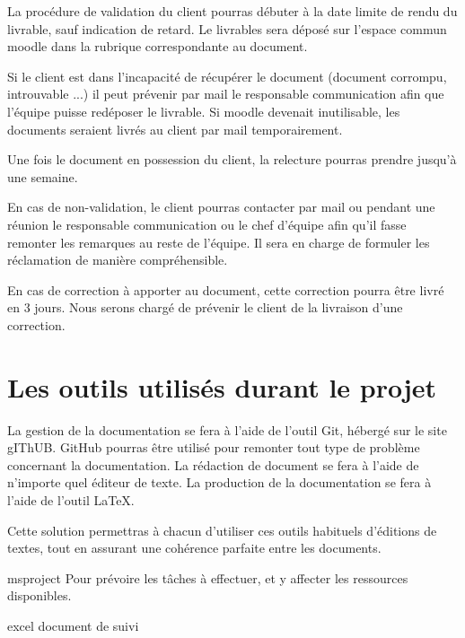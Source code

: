 La procédure de validation du client pourras débuter à la date limite de rendu du livrable, sauf indication de retard. Le livrables sera déposé sur l'espace commun moodle dans la rubrique correspondante au document.

Si le client est dans l’incapacité de récupérer le document (document corrompu, introuvable ...) il peut prévenir par mail le responsable communication afin que l’équipe puisse redéposer le livrable.
Si moodle devenait inutilisable, les documents seraient livrés au client par mail temporairement.

Une fois le document en possession du client, la relecture pourras prendre jusqu’à une semaine.

En cas de non-validation, le client pourras contacter par mail ou pendant une réunion le responsable communication ou le chef d’équipe afin qu’il fasse remonter les remarques au reste de l’équipe.
Il sera en charge de formuler les réclamation de manière compréhensible.

En cas de correction à apporter au document, cette correction pourra être livré en 3 jours.
Nous serons chargé de prévenir le client de la livraison d’une correction.

\section{Les outils utilisés durant le projet}

La gestion de la documentation se fera à l’aide de l’outil Git, hébergé sur le site gIThUB.
GitHub pourras être utilisé pour remonter tout type de problème concernant la documentation.
La rédaction de document se fera à l’aide de n’importe quel éditeur de texte.
La production de la documentation se fera à l’aide de l'outil LaTeX.

Cette solution permettras à chacun  d’utiliser ces outils habituels d’éditions de textes, tout en assurant une cohérence parfaite entre les documents.

msproject
Pour prévoire les tâches à effectuer, et y affecter les ressources disponibles.

excel document de suivi





